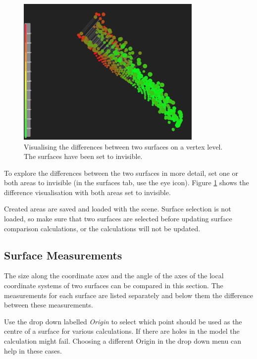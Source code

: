 \begin{figure}[h]
	\centering
	\includegraphics[width=0.8\textwidth]{pics/surfaceComparisonArea3DView2.PNG}
	\caption[Visualising the differences between two surfaces.]{Visualising the differences between two surfaces on a vertex level. The surfaces have been set to invisible.}
	\label{surfaceComparisonArea3DView2.PNG}
\end{figure}

To explore the differences between the two surfaces in more detail, set one or both areas to invisible (in the surfaces tab, use the eye icon). Figure \ref{surfaceComparisonArea3DView2.PNG} shows the difference visualisation with both areas set to invisible.

Created areas are saved and loaded with the scene. Surface selection is not loaded, so make sure that two surfaces are selected before updating surface comparison calculations, or the calculations will not be updated.

\clearpage

\subsection{Surface Measurements}


The size along the coordinate axes and the angle of the axes of the local coordinate systems of two surfaces can be compared in this section. The measurements for each surface are listed separately and below them the difference between these measurements.

Use the drop down labelled \emph{Origin} to select which point should be used as the centre of a surface for various calculations. If there are holes in the model the calculation might fail. Choosing a different Origin in the drop down menu can help in these cases.

